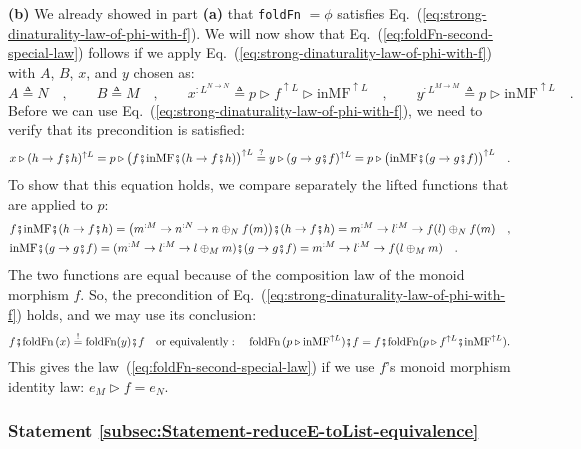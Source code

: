 \textbf{(b)} We already showed in part \textbf{(a)} that \lstinline!foldFn!
$=\phi$ satisfies Eq.~(\ref{eq:strong-dinaturality-law-of-phi-with-f}).
We will now show that Eq.~(\ref{eq:foldFn-second-special-law}) follows
if we apply Eq.~(\ref{eq:strong-dinaturality-law-of-phi-with-f})
with $A$, $B$, $x$, and $y$ chosen as:
\[
A\triangleq N\quad,\quad\quad B\triangleq M\quad,\quad\quad x^{:L^{N\rightarrow N}}\triangleq p\triangleright f^{\uparrow L}\triangleright\text{inMF}^{\uparrow L}\quad,\quad\quad y^{:L^{M\rightarrow M}}\triangleq p\triangleright\text{inMF}^{\uparrow L}\quad.
\]
Before we can use Eq.~(\ref{eq:strong-dinaturality-law-of-phi-with-f}),
we need to verify that its precondition is satisfied:
\[
x\triangleright(h\rightarrow f\bef h)^{\uparrow L}=p\triangleright\big(f\bef\text{inMF}\bef(h\rightarrow f\bef h)\big)^{\uparrow L}\overset{?}{=}y\triangleright(g\rightarrow g\bef f)^{\uparrow L}=p\triangleright\big(\text{inMF}\bef(g\rightarrow g\bef f)\big)^{\uparrow L}\quad.
\]
To show that this equation holds, we compare separately the lifted
functions that are applied to $p$:
\begin{align*}
 & f\bef\text{inMF}\bef(h\rightarrow f\bef h)=\big(m^{:M}\rightarrow n^{:N}\rightarrow n\oplus_{N}f(m)\big)\bef(h\rightarrow f\bef h)=m^{:M}\rightarrow l^{:M}\rightarrow f(l)\oplus_{N}f(m)\quad,\\
 & \text{inMF}\bef(g\rightarrow g\bef f)=(m^{:M}\rightarrow l^{:M}\rightarrow l\oplus_{M}m)\bef(g\rightarrow g\bef f)=m^{:M}\rightarrow l^{:M}\rightarrow f(l\oplus_{M}m)\quad.
\end{align*}
The two functions are equal because of the composition law of the
monoid morphism $f$. So, the precondition of Eq.~(\ref{eq:strong-dinaturality-law-of-phi-with-f})
holds, and we may use its conclusion:
\[
f\bef\text{foldFn}\,(x)\overset{!}{=}\text{foldFn}(y)\bef f\quad\text{or equivalently}:\quad\text{foldFn}\,(p\triangleright\text{inMF}^{\uparrow L})\bef f=f\bef\text{foldFn}(p\triangleright f^{\uparrow L}\bef\text{inMF}^{\uparrow L}).
\]
This gives the law~(\ref{eq:foldFn-second-special-law}) if we use
$f$\textsf{'}s monoid morphism identity law: $e_{M}\triangleright f=e_{N}$.

\subsubsection{Statement \label{subsec:Statement-reduceE-toList-equivalence}\ref{subsec:Statement-reduceE-toList-equivalence}}


